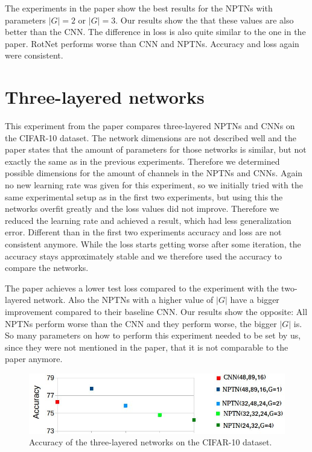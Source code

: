 \documentclass{llncs}
\begin{document}
The experiments in the paper show the best results for the NPTNs with parameters $|G|=2$ or $|G|=3$. Our results show the that these values are also better than the CNN. The difference in loss is also quite similar to the one in the paper. RotNet performs worse than CNN and NPTNs. Accuracy and loss again were consistent. 

\section{Three-layered networks}
This experiment from the paper compares three-layered NPTNs and CNNs on the CIFAR-10 \cite{CIFAR} dataset. 
The network dimensions are not described well and the paper states that the amount of parameters for those networks is similar, but not exactly the same as in the previous experiments. 
Therefore we determined possible dimensions for the amount of channels in the NPTNs and CNNs. 
Again no new learning rate was given for this experiment, so we initially tried with the same experimental setup as in the first two experiments, but using this the networks overfit greatly and the loss values did not improve. 
Therefore we reduced the learning rate and achieved a result, which had less generalization error. 
Different than in the first two experiments accuracy and loss are not consistent anymore. While the loss starts getting worse after some iteration, the accuracy stays approximately stable and we therefore used the accuracy to compare the networks.

The paper achieves a lower test loss compared to the experiment with the two-layered network. Also the NPTNs with a higher value of $|G|$ have a bigger improvement compared to their baseline CNN. Our results show the opposite: All NPTNs perform worse than the CNN and they perform worse, the bigger $|G|$ is.
So many parameters on how to perform this experiment needed to be set by us, since they were not mentioned in the paper, that it is not comparable to the paper anymore.

\begin{figure}
	\begin{center}
	\includegraphics[scale=0.35]{result_images/experiment3_2.jpg}
	\caption{Accuracy of the three-layered networks on  the CIFAR-10 dataset.}
	\label{pic:experiment3}
	\end{center}
\end{figure}
\end{document}
